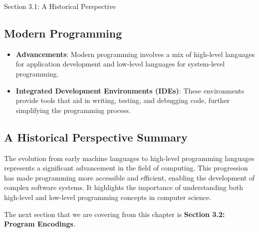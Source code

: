 \begin{notes}{Section 3.1: A Historical Perspective}
    \subsection*{Modern Programming}
    
    \begin{itemize}
        \item \textbf{Advancements}: Modern programming involves a mix of high-level languages for application development and low-level languages for system-level programming.
        \item \textbf{Integrated Development Environments (IDEs)}: These environments provide tools that aid in writing, testing, and debugging code, further simplifying the programming process.
    \end{itemize}
    
    \subsection*{A Historical Perspective Summary}
    
    The evolution from early machine languages to high-level programming languages represents a significant advancement in the field of computing. This progression has made programming more accessible 
    and efficient, enabling the development of complex software systems. It highlights the importance of understanding both high-level and low-level programming concepts in computer science.
\end{notes}

The next section that we are covering from this chapter is \textbf{Section 3.2: Program Encodings}.

